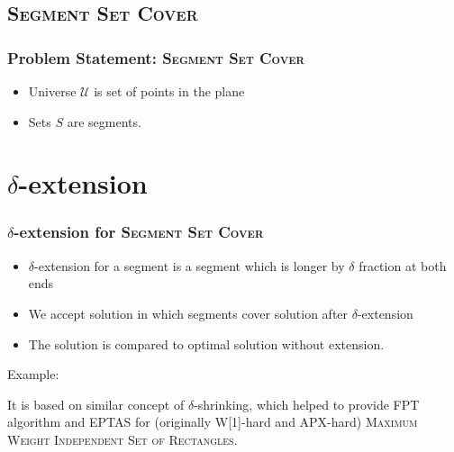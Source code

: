 \documentclass{beamer}
\begin{document}
\subsection{\textsc{Segment Set Cover}}

\begin{frame}
\frametitle{Problem Statement: \textsc{Segment Set Cover}}
\begin{itemize}
\item Universe $\mathcal{U}$ is set of points in the plane
\item Sets $S$ are segments.
\end{itemize}

\begin{center}

\end{center}


\end{frame}

\section{$\delta$-extension}
\begin{frame}
\frametitle{$\delta$-extension for \textsc{Segment Set Cover}}
\begin{itemize}
\item $\delta$-extension for a segment is a segment which is longer by
$\delta$ fraction at both ends
\item We accept solution in which segments cover solution after
$\delta$-extension
\item The solution is compared to optimal solution without extension.
\end{itemize}

Example:



It is based on similar concept of $\delta$-shrinking,
which helped to provide FPT algorithm and EPTAS for 
(originally W[1]-hard and APX-hard)
\textsc{Maximum Weight Independent Set of Rectangles}.
\end{frame}
\end{document}
